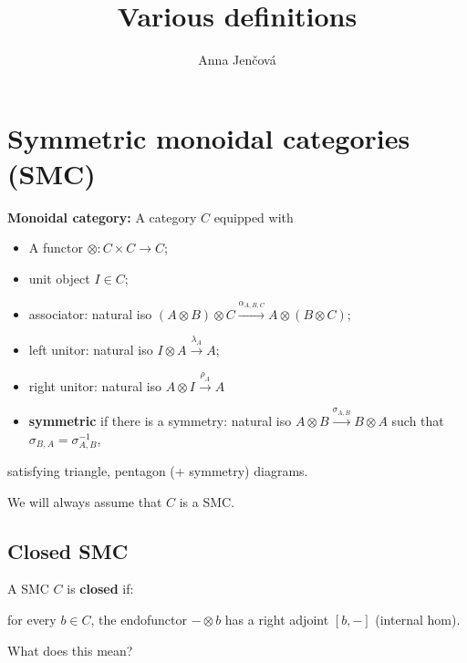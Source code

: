 \documentclass[12pt]{article}
\title{Various definitions}
\author{Anna Jen\v cov\'a}
\theoremstyle{definition}
\theoremstyle{remark}
\begin{document}
\maketitle

\section{Symmetric monoidal categories (SMC)}

 \textbf{Monoidal category:} A category $C$ equipped with
\begin{itemize}
\item A functor $\otimes: C\times C\to C$;
\item unit object $I\in C$;
\item associator: natural iso $(A\otimes B)\otimes C \xrightarrow{\alpha_{A,B,C}} A\otimes
(B\otimes C)$;
\item left unitor: natural iso $I\otimes A \xrightarrow{\lambda_A} A$;


\item right unitor: natural iso $A\otimes I \xrightarrow{\rho_A} A$

\item \textbf{symmetric} if there is a symmetry: natural iso $A\otimes
B\xrightarrow{\sigma_{A,B}} B\otimes A$ such that $\sigma_{B,A}=\sigma_{A,B}^{-1}$, 

\end{itemize}
satisfying triangle, pentagon (+ symmetry) diagrams.

\medskip

We will always assume that $C$ is a SMC.


\subsection{Closed SMC}

A SMC $C$ is \textbf{closed} if:

\medskip %
for every $b\in C$, the endofunctor $-\otimes b$ has a
right adjoint $[b,-]$ (internal hom). 

\medskip
\noindent
What does this mean?
\end{document}
